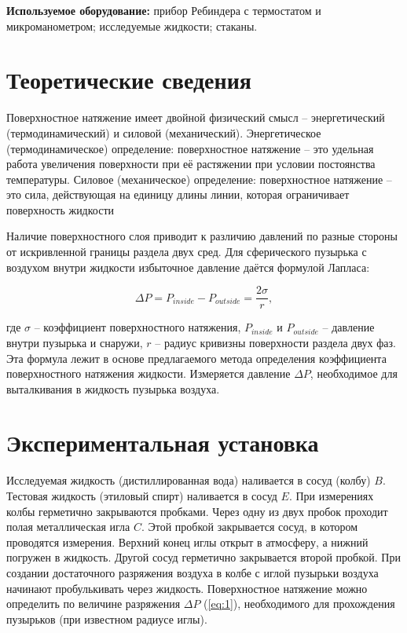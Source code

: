 \documentclass[a4paper, 12pt]{article} %
\begin{document}
\textbf{Используемое оборудование:} прибор Ребиндера с термостатом и микроманометром; исследуемые жидкости; стаканы.

\section{Теоретические сведения}

Поверхностное натяжение имеет двойной физический смысл -- энергетический (термодинамический) и силовой (механический). Энергетическое (термодинамическое) определение: поверхностное натяжение -- это удельная работа увеличения поверхности при её растяжении при условии постоянства температуры. Силовое (механическое) определение: поверхностное натяжение -- это сила, действующая на единицу длины линии, которая ограничивает поверхность жидкости

Наличие поверхностного слоя приводит к различию давлений по разные стороны от искривленной границы раздела двух сред. Для сферического пузырька с воздухом внутри жидкости избыточное давление даётся формулой Лапласа:

\begin{equation}
\Delta P = P_{inside} - P_{outside} = \frac{2\sigma}{r},
\label{eq:1}
\end{equation}

где $\sigma$ – коэффициент поверхностного натяжения, $P_{inside}$ и $P_{outside}$ – давление внутри пузырька и снаружи, $r$ – радиус кривизны поверхности раздела двух фаз. Эта формула лежит в основе предлагаемого метода определения коэффициента поверхностного натяжения жидкости. Измеряется давление $\Delta P$, необходимое для выталкивания в жидкость пузырька воздуха.

\section{Экспериментальная установка}

Исследуемая жидкость (дистиллированная вода) наливается в сосуд (колбу) $B$. Тестовая жидкость (этиловый спирт) наливается в сосуд $E$. При измерениях колбы герметично закрываются пробками. Через одну из двух пробок проходит полая металлическая игла $C$. Этой пробкой закрывается сосуд, в котором проводятся измерения. Верхний конец иглы открыт в атмосферу, а нижний погружен в жидкость. Другой сосуд герметично закрывается второй пробкой. При создании достаточного разряжения воздуха в колбе с иглой пузырьки воздуха начинают пробулькивать через жидкость. Поверхностное натяжение можно определить по величине разряжения $\Delta P$ (\ref{eq:1}), необходимого для прохождения пузырьков (при известном радиусе иглы).
\end{document}
